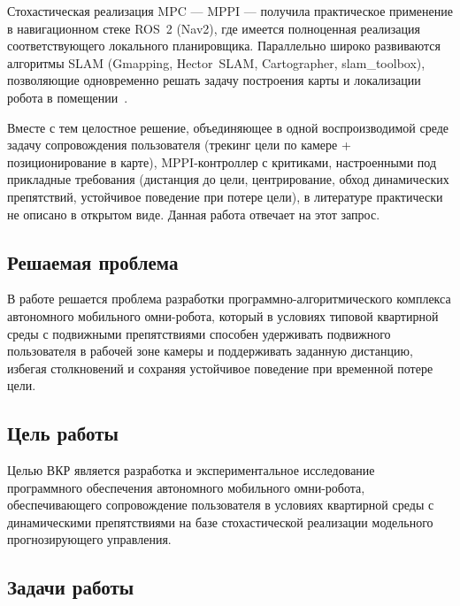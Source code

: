 Стохастическая реализация MPC --- MPPI --- получила практическое
применение в навигационном стеке ROS~2 (Nav2), где имеется полноценная
реализация соответствующего локального планировщика. Параллельно широко
развиваются алгоритмы SLAM (Gmapping, Hector~SLAM,
Cartographer, slam\_toolbox), позволяющие одновременно решать задачу
построения карты и локализации робота в помещении~\cite{Sreerambatla2021SLAM,Nguyen2022SLAM}.

Вместе с тем целостное решение, объединяющее в одной воспроизводимой
среде задачу сопровождения пользователя (трекинг цели по камере +
позиционирование в карте), MPPI-контроллер с критиками, настроенными
под прикладные требования (дистанция до цели, центрирование, обход
динамических препятствий, устойчивое поведение при потере цели), в
литературе практически не описано в открытом виде. Данная работа
отвечает на этот запрос.

\subsection*{Решаемая проблема}

В работе решается проблема разработки программно-алгоритмического
комплекса автономного мобильного омни-робота, который в условиях
типовой квартирной среды с подвижными препятствиями способен
удерживать подвижного пользователя в рабочей зоне камеры и
поддерживать заданную дистанцию, избегая столкновений и сохраняя
устойчивое поведение при временной потере цели.

\subsection*{Цель работы}

Целью ВКР является разработка и экспериментальное исследование
программного обеспечения автономного мобильного омни-робота,
обеспечивающего сопровождение пользователя в условиях квартирной среды
с динамическими препятствиями на базе стохастической реализации
модельного прогнозирующего управления.

\subsection*{Задачи работы}

